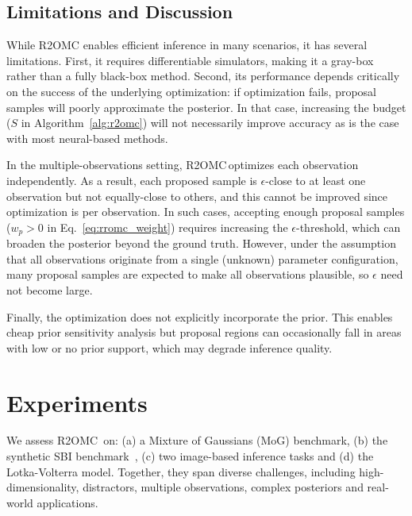 \documentclass[twoside]{article}
\newcommand{\rromc}{R2OMC}
\begin{document}
\subsection{Limitations and Discussion}

While R2OMC enables efficient inference in many scenarios, it has several limitations.
First, it requires differentiable simulators, making it a gray-box rather than a fully black-box method. 
Second, its performance depends critically on the success of the underlying optimization: if optimization fails, proposal samples will poorly approximate the posterior.
In that case, increasing the budget ($S$ in Algorithm~\ref{alg:r2omc}) will not necessarily improve accuracy as is the case with most neural-based methods.

In the multiple-observations setting, \rromc \,optimizes each observation independently. 
As a result, each proposed sample is $\epsilon$-close to at least one observation but not equally-close to others, and this cannot be improved since optimization is per observation. 
In such cases, accepting enough proposal samples ($w_p > 0$ in Eq.~\eqref{eq:rromc_weight}) requires increasing the $\epsilon$-threshold, which can broaden the posterior beyond the ground truth. 
However, under the assumption that all observations originate from a single (unknown) parameter configuration, many proposal samples are expected to make all observations plausible, so $\epsilon$ need not become large.
 

Finally, the optimization does not explicitly incorporate the prior. This enables cheap prior sensitivity analysis but proposal regions can occasionally fall in areas with low or no prior support, which may degrade inference quality.


\section{Experiments}
\label{sec:experiments}

We assess \rromc~on: 
(a) a Mixture of Gaussians (MoG) benchmark, 
(b) the synthetic SBI benchmark~\citep{lueckmann2021benchmarking},
(c) two image-based inference tasks and
(d) the Lotka-Volterra model.
Together, they span diverse challenges, including high-dimensionality, distractors, multiple observations, complex posteriors and real-world applications.
\end{document}
